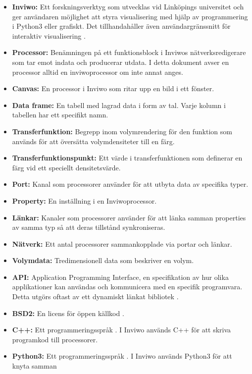 \documentclass[10pt,oneside,swedish]{article}
\begin{document}
\begin{itemize}
\item
  \textbf{Inviwo:} Ett forskningsverktyg som utvecklas vid Linköpings
  universitet och ger användaren möjlighet att styra visualisering med
  hjälp av programmering i Python3 eller grafiskt. Det tillhandahåller
  även användargränssnitt för interaktiv visualisering \cite{Inviwo}.
\item
  \textbf{Processor:} Benämningen på ett funktionsblock i Inviwos
  nätverksredigerare som tar emot indata och producerar utdata. I detta
  dokument avser en processor alltid en inviwoprocessor om inte annat
  anges.
\item
  \textbf{Canvas:} En processor i Inviwo som ritar upp en bild i ett
  fönster.
\item
  \textbf{Data frame:} En tabell med lagrad data i form av tal. Varje
  kolumn i tabellen har ett specifikt namn.
\item
  \textbf{Transferfunktion:} Begrepp inom volymrendering för den
  funktion som används för att översätta volymdensiteter till en färg.
\item
  \textbf{Transferfunktionspunkt:} Ett värde i transferfunktionen som
  definerar en färg vid ett speciellt densitetsvärde.
\item
  \textbf{Port:} Kanal som processorer använder för att utbyta data av
  specifika typer.
\item
  \textbf{Property:} En inställning i en Inviwoprocessor.
\item
  \textbf{Länkar:} Kanaler som processorer använder för att länka samman
  properties av samma typ så att deras tillstånd synkroniseras.
\item
  \textbf{Nätverk:} Ett antal processorer sammankopplade via portar och
  länkar.
\item
  \textbf{Volymdata:} Tredimensionell data som beskriver en volym.
\item
  \textbf{API:} Application Programming Interface, en specifikation av
  hur olika applikationer kan användas och kommunicera med en specifik
  programvara. Detta utgörs oftast av ett dynamiskt länkat bibliotek
  \cite{API}. 
\item
  \textbf{BSD2:} En licens för öppen källkod \cite{BSD2}.
\item
  \textbf{C++:} Ett programmeringsspråk \cite{Cpp}. I Inviwo används
  C++ för att skriva programkod till processorer.
\item
  \textbf{Python3:} Ett programmeringsspråk \cite{Python}
  \cite{Python3}. I Inviwo används Python3 för att knyta samman

\end{itemize}
\end{document}
